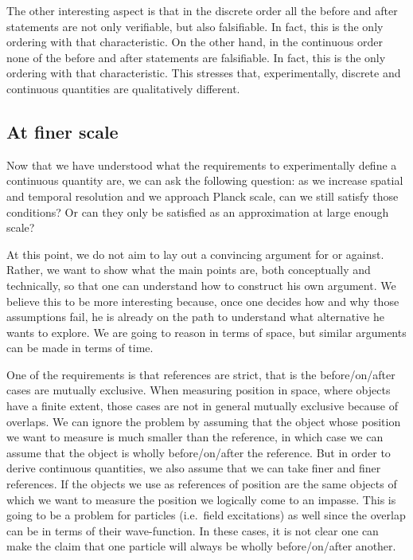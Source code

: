 \documentclass[submission,copyright,creativecommons]{eptcs}
\begin{document}
The other interesting aspect is that in the discrete order all the before and after statements are not only verifiable, but also falsifiable. In fact, this is the only ordering with that characteristic. On the other hand, in the continuous order none of the before and after statements are falsifiable. In fact, this is the only ordering with that characteristic. This stresses that, experimentally, discrete and continuous quantities are qualitatively different.

\subsection*{At finer scale}

Now that we have understood what the requirements to experimentally define a continuous quantity are, we can ask the following question: as we increase spatial and temporal resolution and we approach Planck scale, can we still satisfy those conditions? Or can they only be satisfied as an approximation at large enough scale?

At this point, we do not aim to lay out a convincing argument for or against. Rather, we want to show what the main points are, both conceptually and technically, so that one can understand how to construct his own argument. We believe this to be more interesting because, once one decides how and why those assumptions fail, he is already on the path to understand what alternative he wants to explore. We are going to reason in terms of space, but similar arguments can be made in terms of time.

One of the requirements is that references are strict, that is the before/on/after cases are mutually exclusive. When measuring position in space, where objects have a finite extent, those cases are not in general mutually exclusive because of overlaps. We can ignore the problem by assuming that the object whose position we want to measure is much smaller than the reference, in which case we can assume that the object is wholly before/on/after the reference. But in order to derive continuous quantities, we also assume that we can take finer and finer references. If the objects we use as references of position are the same objects of which we want to measure the position we logically come to an impasse. This is going to be a problem for particles (i.e.~field excitations) as well since the overlap can be in terms of their wave-function. In these cases, it is not clear one can make the claim that one particle will always be wholly before/on/after another.
\end{document}
